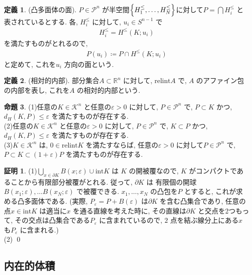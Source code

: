 \documentclass[10pt, fleqn, label-section=none]{bxjsarticle}
\theoremstyle{definition}
\newtheorem{dfn}{定義}[section]
\newtheorem{prop}[dfn]{命題}
\newtheorem*{pf*}{証明}
\newcommand{\veps}{\varepsilon}
\newcommand{\cbra}[1]{\mleft\{#1\mright\}}
\renewcommand{\;}{\, ; \,}
\begin{document}
\begin{dfn}(凸多面体の面). $P \in \mathcal P^n$ が半空間$\cbra{H^\leq _1, \ldots, H^\leq _N}$に対して$P = \bigcap H^{\leq}_i$ と表されているとする. 各, $H^\leq_i$ に対して, $u_i \in S^{n-1}$ で
\begin{align*} H^\leq_i =  H^{\leq} (K; u_i) \end{align*}
を満たすものがとれるので, 
\begin{align*} P(u_i) \coloneqq P \cap H^{\leq} (K; u_i) \end{align*}
と定めて, これを$u_i$ 方向の面という. 
\end{dfn}


\begin{dfn}(相対的内部). 部分集合$A \subset \mathbb R^n$ に対して, $\textrm{relint} A$ で, $A$ のアファイン包の内部を表し, これを$A$ の相対的内部という. 

\end{dfn}

\begin{prop}
(1)任意の$K \in \mathcal K ^n$ と任意の$\veps > 0$ に対して, $P \in \mathcal P^n$ で, $P \subset K$ かつ, $d_H(K, P) \leq \veps$ を満たすものが存在する. \\
(2)任意の$K \in \mathcal K ^n$ と任意の$\veps > 0$ に対して, $P \in \mathcal P^n$ で, $K \subset P$ かつ, $d_H(K, P) \leq \veps$ を満たすものが存在する.  \\
(3)$K \in \mathcal K ^n$ は, $0 \in \textrm{relint}K$ を満たすならば, 任意の$\veps > 0$ に対して$P \in \mathcal P^n$ で, $P \subset K \subset (1 + \veps) P$ を満たすものが存在する. 

\end{prop}
\begin{pf*}
(1)$\bigcup_{x \in \partial K} B(x; \veps) \cup \textrm{int} K$ は $K$ の開被覆なので, $K$ がコンパクトであることから有限部分被覆がとれる. 従って, $\partial K$ は 有限個の開球$B(x_1; \veps), \ldots B(x_N; \veps)$ で被覆できる. $x_1, \ldots , x_N$ の凸包を$P$ とすると, これが求める凸多面体である. (実際, $P_\veps = P + B(\veps)$ は$\partial K$ を含む凸集合であり, 任意の点$x \in \textrm{int} K$ は適当に$x$ を通る直線を考えた時に, その直線は$\partial K$ と交点を2つもって, その交点は凸集合である$P_\veps$ に含まれているので, $2$ 点を結ぶ線分上にある$x$ も$P_\veps$ に含まれる.) \\
(2)
\qed
\end{pf*}

\subsection{内在的体積}
\end{document}
